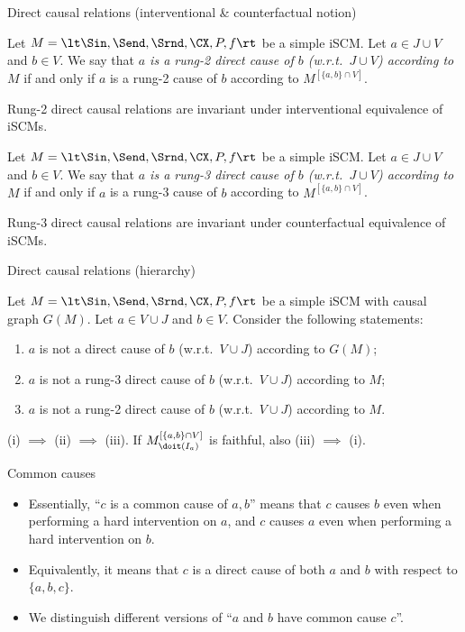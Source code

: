 \begin{frame}{Direct causal relations (interventional \& counterfactual notion)}
\begin{Def}[\ref{def:scm_rung2_direct_cause_of}]
  Let $M = \lt \Sin, \Send, \Srnd, \CX, P, f \rt$ be a simple iSCM.
  Let $a \in J \cup V$ and $b \in V$. 
  We say that \emph{$a$ is a rung-2 direct cause of $b$ (w.r.t.\ $J \cup V$) according to $M$} if and only if $a$ is a rung-2 cause of $b$ according to $M^{[\{a,b\}\cap V]}$.
\end{Def}
  Rung-2 direct causal relations are invariant under interventional equivalence of iSCMs.
\begin{Def}[\ref{def:scm_rung3_direct_cause_of}]
  Let $M = \lt \Sin, \Send, \Srnd, \CX, P, f \rt$ be a simple iSCM.
  Let $a \in J \cup V$ and $b \in V$. 
  We say that \emph{$a$ is a rung-3 direct cause of $b$ (w.r.t.\ $J \cup V$) according to $M$} if and only if $a$ is a rung-3 cause of $b$ according to $M^{[\{a,b\}\cap V]}$.
\end{Def}
  Rung-3 direct causal relations are invariant under counterfactual equivalence of iSCMs.
\end{frame}

\begin{frame}{Direct causal relations (hierarchy)}
\begin{Cor}[\ref{cor:scm_direct_cause_of}]
  Let $M = \lt \Sin, \Send, \Srnd, \CX, P, f \rt$ be a simple iSCM with causal graph $G(M)$.
  Let $a \in V \cup J$ and $b \in V$.
  Consider the following statements:
  \begin{enumerate}
    \item[(i)] $a$ is not a direct cause of $b$ (w.r.t.\ $V \cup J$) according to $G(M)$;
    \item[(ii)] $a$ is not a rung-3 direct cause of $b$ (w.r.t.\ $V \cup J$) according to $M$;
    \item[(iii)] $a$ is not a rung-2 direct cause of $b$ (w.r.t.\ $V \cup J$) according to $M$.
  \end{enumerate}
  (i) $\implies$ (ii) $\implies$ (iii). If $M^{[\{a,b\}\cap V]}_{\doit(I_a)}$ is faithful, also (iii) $\implies$ (i).
\end{Cor}
\end{frame}

\begin{frame}{Common causes}
  \begin{itemize}
    \item Essentially, ``$c$ is a common cause of $a,b$'' means that $c$ causes $b$ even when performing a hard intervention on $a$, and $c$ causes $a$ even when performing a hard intervention on $b$.
    \item Equivalently, it means that $c$ is a direct cause of both $a$ and $b$ with respect to $\{a,b,c\}$.
    \item We distinguish different versions of ``$a$ and $b$ have common cause $c$''.
  \end{itemize}
\end{frame}

